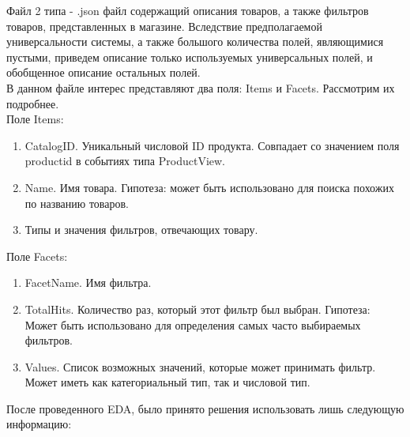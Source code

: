 \documentclass[14pt]{mmcs_article}
\newenvironment{myenumerate}
{ \begin{enumerate}
		\setlength{\itemsep}{0pt}
		\setlength{\parskip}{0pt}
		\setlength{\parsep}{0pt}     }
	{ \end{enumerate}                  }
\begin{document}
Файл 2 типа - .json файл содержащий описания товаров, а также фильтров товаров, представленных в магазине. Вследствие предполагаемой универсальности системы, а также большого количества полей, являющимися пустыми, приведем описание только используемых универсальных полей, и обобщенное описание остальных полей.\\
В данном файле интерес представляют два поля: Items и Facets. Рассмотрим их подробнее. \\
Поле Items:
\begin{myenumerate}
	
	\item CatalogID. Уникальный числовой ID продукта. Совпадает со значением поля productid в событиях типа ProductView.
	\item Name. Имя товара. Гипотеза: может быть использовано для поиска похожих по названию товаров.
	\item Типы и значения фильтров, отвечающих товару.
\end{myenumerate}

Поле Facets:
\begin{myenumerate}
	
	\item FacetName. Имя фильтра.
	\item TotalHits. Количество раз, который этот фильтр был выбран. Гипотеза: Может быть использовано для определения самых часто выбираемых фильтров.
	\item Values. Список возможных значений, которые может принимать фильтр. Может иметь как категориальный тип, так и числовой тип. 
\end{myenumerate}

После проведенного EDA, было принято решения использовать лишь следующую информацию:
\end{document}
